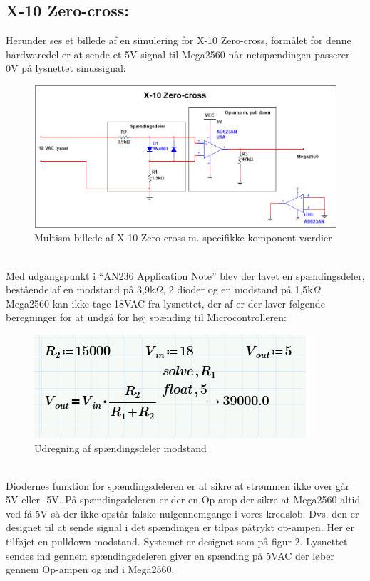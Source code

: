 \documentclass[11pt]{article}
\begin{document}
\subsection{X-10 Zero-cross: }
Herunder ses et billede af en simulering for X-10 Zero-cross, formålet for denne hardwaredel er at sende et 5V signal til Mega2560 når netspændingen passerer 0V på lysnettet sinussignal:
\begin{figure}[!h]
\includegraphics[scale = 0.7]{Zero-cross-ms}
\caption{Multism billede af X-10 Zero-cross m. specifikke komponent værdier}
\end{figure}\\
Med udgangspunkt i ``AN236 Application Note'' blev der lavet en spændingsdeler, bestående af en modstand på 3,9k$\Omega$, 2 dioder og en modstand på 1,5k$\Omega$. Mega2560 kan ikke tage 18VAC fra lysnettet, der af er der laver følgende beregninger for at undgå for høj spænding til Microcontrolleren: 
\begin{figure}[!h]
\centering
\includegraphics[scale = 1]{udregning-af-spandingsdeler}
\caption{Udregning af spændingsdeler modstand}
\end{figure}\\
Diodernes funktion for spændingsdeleren er at sikre at strømmen ikke over går 5V eller -5V. På spændingsdeleren er der en Op-amp der sikre at Mega2560 altid ved få 5V så der ikke opstår falske nulgennemgange i vores kredsløb. Dvs. den er designet til at sende signal i det spændingen er tilpas påtrykt op-ampen. Her er tilføjet en pulldown modstand. Systemet er designet som på figur 2. Lysnettet sendes ind gennem spændingsdeleren giver en spænding på 5VAC der løber gennem Op-ampen og ind i Mega2560.
\end{document}
